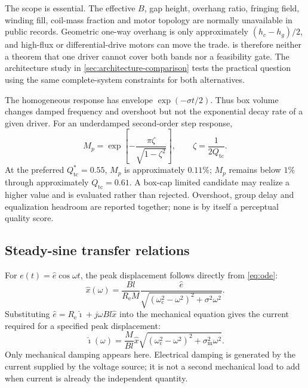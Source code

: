 \documentclass[11pt,a4paper]{article}
\numberwithin{equation}{section}
\newcommand{\Mms}{M}
\renewcommand{\Re}{R_{\mathrm{e}}}
\newcommand{\Bl}{Bl}
\newcommand{\Qtc}{Q_{\mathrm{tc}}}
\newcommand{\wc}{\omega_{\mathrm{c}}}
\newcommand{\sm}{\sigma_{\mathrm{m}}}
\begin{document}
The scope is essential.  The effective $B$, gap height, overhang ratio,
fringing field, winding fill, coil-mass fraction and motor topology are
normally unavailable in public records.  Geometric one-way overhang is only
approximately $(h_c-h_g)/2$, and high-flux or differential-drive motors can
move the trade.   is therefore neither a theorem that
one driver cannot cover both bands nor a feasibility gate.  The
architecture study in \cref{sec:architecture-comparison} tests the practical
question using the same complete-system constraints for both alternatives.

The homogeneous response has envelope $\exp(-\sigma t/2)$.  Thus box volume
changes damped frequency and overshoot but not the exponential decay rate of
a given driver.  For an underdamped second-order step response,
\begin{equation}
	M_p=\exp\left[
	-\frac{\pi\zeta}{\sqrt{1-\zeta^2}}
	\right],\qquad \zeta=\frac{1}{2\Qtc}.
	\label{eq:overshoot}
\end{equation}
At the preferred $\Qtc^\ast=0.55$, $M_p$ is approximately $0.11\%$;
$M_p$ remains below $1\%$ through approximately $\Qtc=0.61$.  A box-cap
limited candidate may realize a higher value and is evaluated rather than
rejected.  Overshoot, group delay and equalization headroom are reported
together; none is by itself a perceptual quality score.

\subsection{Steady-sine transfer relations}
\label{sec:model-steady}

For $e(t)=\hat e\cos\omega t$, the peak displacement follows directly from
\cref{eq:ode}:
\begin{equation}
	\boxed{
	\hat x(\omega)=
	\frac{\Bl}{\Re\Mms}
	\frac{\hat e}
	{\sqrt{(\wc^2-\omega^2)^2+\sigma^2\omega^2}}}.
	\label{eq:xofe}
\end{equation}
Substituting $\hat e=\Re\hat\imath+j\omega\Bl\hat x$ into the mechanical
equation gives the current required for a specified peak displacement:
\begin{equation}
	\boxed{
	\hat\imath(\omega)=
	\frac{\Mms}{\Bl}\hat x
	\sqrt{(\wc^2-\omega^2)^2+\sm^2\omega^2}}.
	\label{eq:iofx}
\end{equation}
Only mechanical damping appears here.  Electrical damping is generated by
the current supplied by the voltage source; it is not a second mechanical
load to add when current is already the independent quantity.
\end{document}
